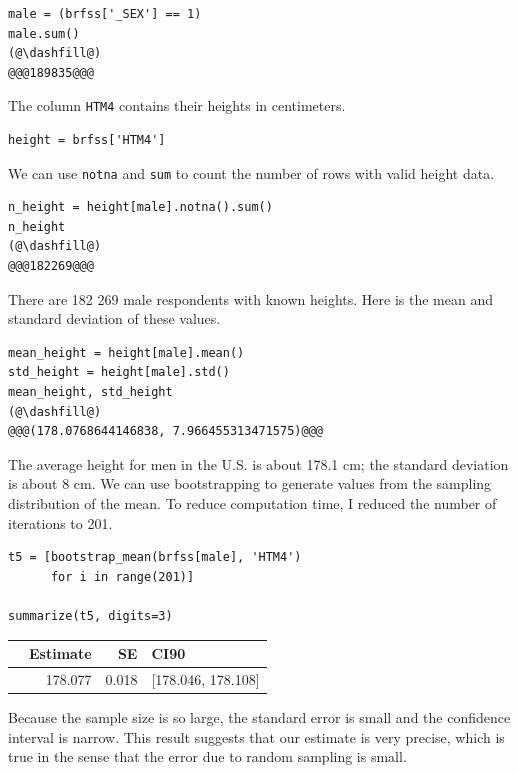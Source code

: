 \begin{lstlisting}[]
male = (brfss['_SEX'] == 1)
male.sum()
(@\dashfill@)
@@@189835@@@
\end{lstlisting}

The column \passthrough{\lstinline!HTM4!} contains their heights in
centimeters.

\begin{lstlisting}[]
height = brfss['HTM4']
\end{lstlisting}

We can use \passthrough{\lstinline!notna!} and
\passthrough{\lstinline!sum!} to count the number of rows with valid
height data.

\begin{lstlisting}[]
n_height = height[male].notna().sum()
n_height
(@\dashfill@)
@@@182269@@@
\end{lstlisting}

There are 182 269 male respondents with known heights. Here is the mean
and standard deviation of these values.

\begin{lstlisting}[]
mean_height = height[male].mean()
std_height = height[male].std()
mean_height, std_height
(@\dashfill@)
@@@(178.0768644146838, 7.966455313471575)@@@
\end{lstlisting}

The average height for men in the U.S. is about 178.1 cm; the standard
deviation is about 8 cm. We can use bootstrapping to generate values
from the sampling distribution of the mean. To reduce computation time,
I reduced the number of iterations to 201.

\begin{lstlisting}[]
t5 = [bootstrap_mean(brfss[male], 'HTM4')
      for i in range(201)]

summarize(t5, digits=3)
\end{lstlisting}

\begin{tabular}{lrrl}
\midrule
{} &  Estimate &     SE &                CI90 \\
\midrule
{} &   178.077 &  0.018 &  [178.046, 178.108] \\
\midrule
\end{tabular}

Because the sample size is so large, the standard error is small and the
confidence interval is narrow. This result suggests that our estimate is
very precise, which is true in the sense that the error due to random
sampling is small.

